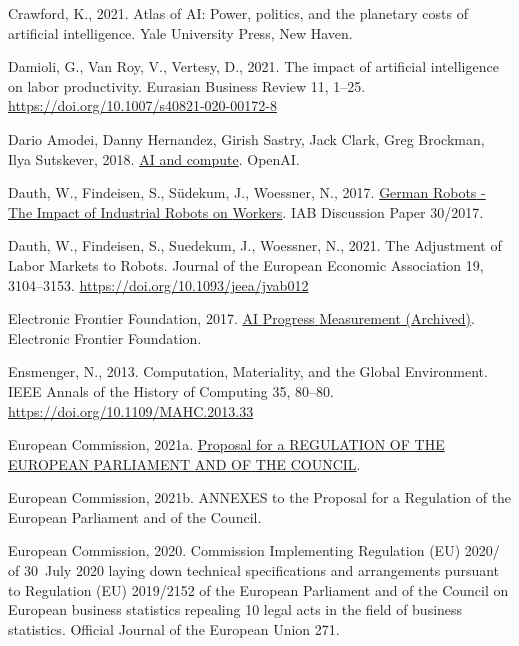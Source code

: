 \documentclass[
  12pt,
  a4paperpaper,
]{article}
\newlength{\cslhangindent}
\newenvironment{CSLReferences}[2] %
 {\begin{list}{}{%
  \setlength{\itemindent}{0pt}
  \setlength{\leftmargin}{0pt}
  \setlength{\parsep}{0pt}
  \ifodd #1
   \setlength{\leftmargin}{\cslhangindent}
   \setlength{\itemindent}{-1\cslhangindent}
  \fi
  \setlength{\itemsep}{#2\baselineskip}}}
 {\end{list}}
\begin{document}
\begin{CSLReferences}{1}{0}
Crawford, K., 2021. Atlas of {AI}: Power, politics, and the planetary
costs of artificial intelligence. Yale University Press, New Haven.

Damioli, G., Van Roy, V., Vertesy, D., 2021. The impact of artificial
intelligence on labor productivity. Eurasian Business Review 11, 1--25.
\url{https://doi.org/10.1007/s40821-020-00172-8}

Dario Amodei, Danny Hernandez, Girish Sastry, Jack Clark, Greg Brockman,
Ilya Sutskever, 2018.
\href{https://openai.com/research/ai-and-compute}{{AI} and compute}.
OpenAI.

Dauth, W., Findeisen, S., Südekum, J., Woessner, N., 2017.
\href{https://ssrn.com/abstract=3039031}{German {Robots} - {The}
{Impact} of {Industrial} {Robots} on {Workers}}. IAB Discussion Paper
30/2017.

Dauth, W., Findeisen, S., Suedekum, J., Woessner, N., 2021. The
{Adjustment} of {Labor} {Markets} to {Robots}. Journal of the European
Economic Association 19, 3104--3153.
\url{https://doi.org/10.1093/jeea/jvab012}

Electronic Frontier Foundation, 2017.
\href{https://www.eff.org/de/ai/metrics}{{AI} {Progress} {Measurement}
({Archived})}. Electronic Frontier Foundation.

Ensmenger, N., 2013. Computation, {Materiality}, and the {Global}
{Environment}. IEEE Annals of the History of Computing 35, 80--80.
\url{https://doi.org/10.1109/MAHC.2013.33}

European Commission, 2021a.
\href{https://eur-lex.europa.eu/legal-content/EN/TXT/HTML/?uri=CELEX:52021PC0206}{Proposal
for a {REGULATION} {OF} {THE} {EUROPEAN} {PARLIAMENT} {AND} {OF} {THE}
{COUNCIL}}.

European Commission, 2021b. {ANNEXES} to the {Proposal} for a
{Regulation} of the {European} {Parliament} and of the {Council}.

European Commission, 2020. Commission {Implementing} {Regulation} ({EU})
2020/ of 30~{July} 2020 laying down technical specifications and
arrangements pursuant to {Regulation} ({EU}) 2019/2152 of the {European}
{Parliament} and of the {Council} on {European} business statistics
repealing 10 legal acts in the field of business statistics. Official
Journal of the European Union 271.


\end{CSLReferences}
\end{document}
